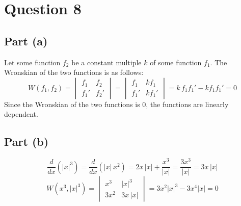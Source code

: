 \documentclass{article}
\begin{document}
\section*{Question 8}
\subsection*{Part (a)}
\begin{center}
Let some function \(f_2\) be a constant multiple \(k\) of some function \(f_1\). The Wronskian of the two functions is as follows:
\[W(f_1,f_2)=
\begin{vmatrix}
	f_1 & f_2 \\
	f_1' & f_2'
\end{vmatrix}
=
\begin{vmatrix}
	f_1 & kf_1 \\
	f_1' & kf_1'
\end{vmatrix}
=k\,f_1f_1'-kf_1f_1'=0\]
Since the Wronskian of the two functions is 0, the functions are linearly dependent.
\end{center}
\subsection*{Part (b)}
\[\frac{d}{dx}\left(|x|^3\right)=\frac{d}{dx}\left(|x|\,x^2\right)=2x\,|x|+\frac{x^3}{|x|}=\frac{3x^3}{|x|}=3x\,|x|\]
\[W\left(x^3,|x|^3\right)=
\begin{vmatrix}
	x^3 & |x|^3 \\
	3x^2 & 3x\,|x|
\end{vmatrix}
=3x^2|x|^3-3x^4|x|=\boxed{0}\]
\end{document}
